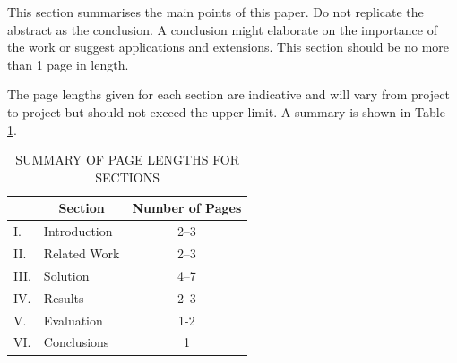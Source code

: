\documentclass[12pt,a4paper]{article}
\begin{document}
This section summarises the main points of this paper.  Do not replicate the abstract as the conclusion.  A conclusion might elaborate on the importance of the work or suggest applications and extensions.  This section should be no more than 1 page in length.

The page lengths given for each section are indicative and will vary from project to project but should not exceed the upper limit.  A summary is shown in Table \ref{summary}.

\begin{table}[htb]
    \centering
    \caption{SUMMARY OF PAGE LENGTHS FOR SECTIONS}
    \vspace*{6pt}
    \label{summary}
    \begin{tabular}{|ll|c|} \hline
             & \multicolumn{1}{c|}{\bf Section} & {\bf Number of Pages} \\ \hline
        I.   & Introduction                     & 2--3                  \\ \hline
        II.  & Related Work                     & 2--3                  \\ \hline
        III. & Solution                         & 4--7                  \\ \hline
        IV.  & Results                          & 2--3                  \\ \hline
        V.   & Evaluation                       & 1-2                   \\ \hline
        VI.  & Conclusions                      & 1                     \\ \hline
    \end{tabular}
\end{table}

\newpage

\end{document}
